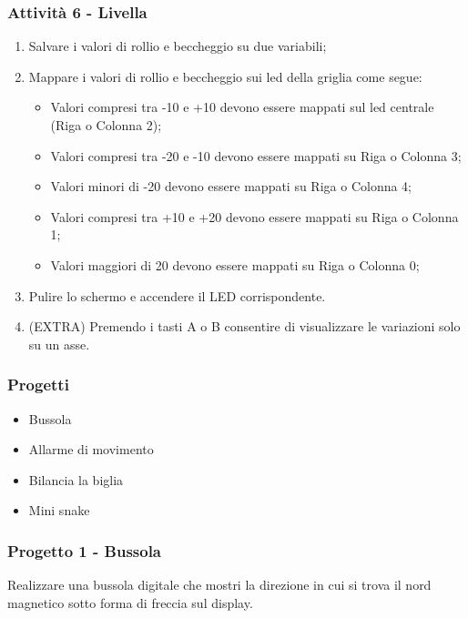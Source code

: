 \documentclass{beamer}
\begin{document}
\begin{frame}
	\frametitle{Attività 6 - Livella}

	\begin{enumerate}
		\item Salvare i valori di rollio e beccheggio su due variabili;
		\item Mappare i valori di rollio e beccheggio sui led della griglia come segue:
		\begin{itemize}
			\item Valori compresi tra -10 e +10 devono essere mappati sul led centrale (Riga o Colonna 2);
			\item Valori compresi tra -20 e -10 devono essere mappati su Riga o Colonna 3;
			\item Valori minori di -20 devono essere mappati su Riga o Colonna 4;
			\item Valori compresi tra +10 e +20 devono essere mappati su Riga o Colonna 1;
			\item Valori maggiori di 20 devono essere mappati su Riga o Colonna 0;
		\end{itemize}
		\item Pulire lo schermo e accendere il LED corrispondente.
		\item (EXTRA) Premendo i tasti A o B consentire di visualizzare le variazioni solo su un asse.
	\end{enumerate}

\end{frame}

\begin{frame}
	\frametitle{Progetti}

	\begin{itemize}
		\item Bussola
		\item Allarme di movimento
		\item Bilancia la biglia
		\item Mini snake
	\end{itemize}
	
\end{frame}

\begin{frame}
	\frametitle{Progetto 1 - Bussola}

	Realizzare una bussola digitale che mostri la direzione in cui si trova il nord magnetico sotto forma di freccia sul display.
	
\end{frame}
\end{document}
